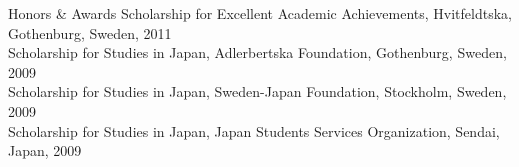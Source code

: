\documentclass{resume}
\begin{document}

\begin{rsection}{Honors \& Awards}
  Scholarship for Excellent Academic Achievements, Hvitfeldtska, Gothenburg, Sweden, 2011\\%
  Scholarship for Studies in Japan, Adlerbertska Foundation, Gothenburg, Sweden, 2009\\%
  Scholarship for Studies in Japan, Sweden-Japan Foundation, Stockholm, Sweden, 2009\\%
  Scholarship for Studies in Japan, Japan Students Services Organization, Sendai, Japan, 2009%
\end{rsection}
\end{document}
